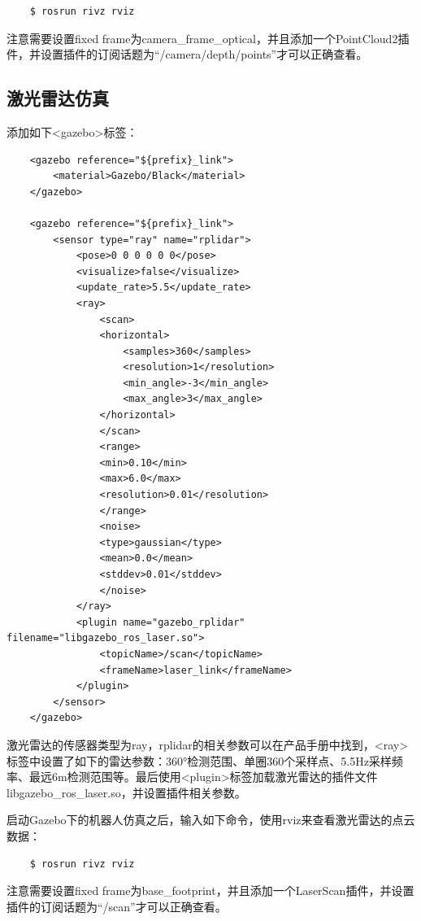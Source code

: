 \documentclass[9pt, oneside]{book}
\begin{document}
\begin{verbatim}
    $ rosrun rivz rviz
\end{verbatim}

注意需要设置fixed frame为camera\_frame\_optical，并且添加一个PointCloud2插件，并设置插件的订阅话题为“/camera/depth/points”才可以正确查看。

\subsection{激光雷达仿真}

添加如下<gazebo>标签：

\begin{verbatim}
    <gazebo reference="${prefix}_link">
        <material>Gazebo/Black</material>
    </gazebo>

    <gazebo reference="${prefix}_link">
        <sensor type="ray" name="rplidar">
            <pose>0 0 0 0 0 0</pose>
            <visualize>false</visualize>
            <update_rate>5.5</update_rate>
            <ray>
                <scan>
                <horizontal>
                    <samples>360</samples>
                    <resolution>1</resolution>
                    <min_angle>-3</min_angle>
                    <max_angle>3</max_angle>
                </horizontal>
                </scan>
                <range>
                <min>0.10</min>
                <max>6.0</max>
                <resolution>0.01</resolution>
                </range>
                <noise>
                <type>gaussian</type>
                <mean>0.0</mean>
                <stddev>0.01</stddev>
                </noise>
            </ray>
            <plugin name="gazebo_rplidar" filename="libgazebo_ros_laser.so">
                <topicName>/scan</topicName>
                <frameName>laser_link</frameName>
            </plugin>
        </sensor>
    </gazebo>
\end{verbatim}

激光雷达的传感器类型为ray，rplidar的相关参数可以在产品手册中找到，<ray>标签中设置了如下的雷达参数：360°检测范围、单圈360个采样点、5.5Hz采样频率、最远6m检测范围等。最后使用<plugin>标签加载激光雷达的插件文件libgazebo\_ros\_laser.so，并设置插件相关参数。

启动Gazebo下的机器人仿真之后，输入如下命令，使用rviz来查看激光雷达的点云数据：

\begin{verbatim}
    $ rosrun rivz rviz
\end{verbatim}

注意需要设置fixed frame为base\_footprint，并且添加一个LaserScan插件，并设置插件的订阅话题为“/scan”才可以正确查看。
\end{document}
